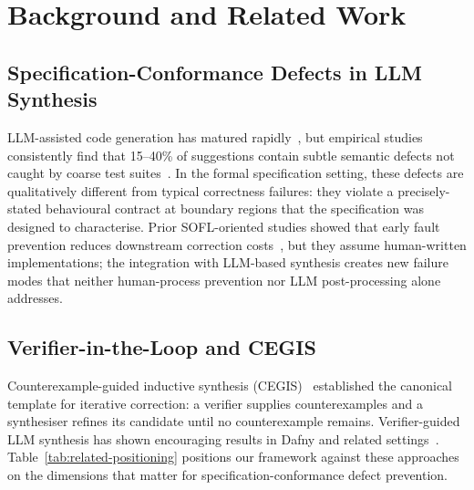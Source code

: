 \section{Background and Related Work}
\label{sec:related}

\subsection{Specification-Conformance Defects in LLM Synthesis}

LLM-assisted code generation has matured rapidly~\cite{chen2021codex,openai2023gpt4},
but empirical studies consistently find that 15--40\% of suggestions contain subtle
semantic defects not caught by coarse test suites~\cite{dakhel2023copilot}.
In the formal specification setting, these defects are qualitatively different from
typical correctness failures: they violate a precisely-stated behavioural contract at
boundary regions that the specification was designed to characterise.
Prior SOFL-oriented studies showed that early fault prevention reduces downstream
correction costs~\cite{li2022qrs_companion,li2023iet_faultprevention}, but they assume human-written
implementations; the integration with LLM-based synthesis creates new failure modes that
neither human-process prevention nor LLM post-processing alone addresses.

\subsection{Verifier-in-the-Loop and CEGIS}

Counterexample-guided inductive synthesis (CEGIS)~\cite{solarlezama2008sketching} established the
canonical template for iterative correction: a verifier supplies counterexamples and a
synthesiser refines its candidate until no counterexample remains.
Verifier-guided LLM synthesis has shown encouraging results in Dafny and related
settings~\cite{sun2024clover,loughridge2024dafnybench}.
Table~\ref{tab:related-positioning} positions our framework against these approaches on
the dimensions that matter for specification-conformance defect prevention.

